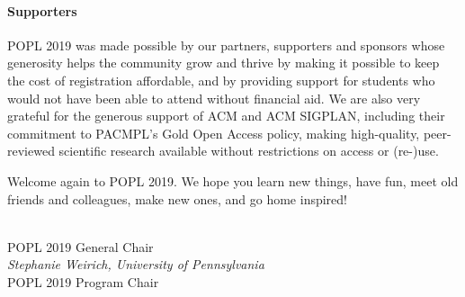 \paragraph{Supporters}
%
POPL 2019 was made possible by our partners, supporters
and sponsors whose generosity helps the community grow
and thrive by making it possible to keep the cost of
registration affordable, and by providing support for
students who would not have been able to attend without
financial aid.
%
We are also very grateful for the generous support of
ACM and ACM SIGPLAN, including their commitment to
PACMPL's Gold Open Access policy, making high-quality,
peer-reviewed scientific research available without
restrictions on access or (re-)use.

\medskip
Welcome again to POPL 2019. We hope you learn new things,
have fun, meet old friends and colleagues, make new
ones, and go home inspired!

\begin{flushright}
 \\
POPL 2019 General Chair
\medskip \\
\textit{Stephanie Weirich, University of Pennsylvania} \\
POPL 2019 Program Chair
\medskip \\
\end{flushright}




\newpage
